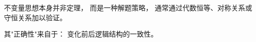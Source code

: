 \begin{ideaBox}
不变量思想本身并非定理，
而是一种解题策略，
通常通过代数恒等、对称关系或守恒关系加以验证。

其"正确性"来自于：
变化前后逻辑结构的一致性。
\end{ideaBox}

